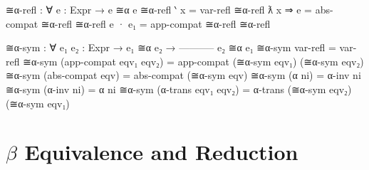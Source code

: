 \documentclass{lecturenotes}
\begin{document}
\begin{itemize}
\begin{code}
≅α-refl : ∀ {e : Expr} → e ≅α e
≅α-refl {‵ x} = var-refl
≅α-refl {ƛ x ⇒ e} = abs-compat ≅α-refl
≅α-refl {e · e₁} = app-compat ≅α-refl ≅α-refl

≅α-sym : ∀ {e₁ e₂ : Expr} →
  e₁ ≅α e₂ →
  -----------
  e₂ ≅α e₁
≅α-sym var-refl = var-refl
≅α-sym (app-compat eqv₁ eqv₂) = app-compat (≅α-sym eqv₁) (≅α-sym eqv₂)
≅α-sym (abs-compat eqv) = abs-compat (≅α-sym eqv)
≅α-sym (α ni) = α-inv ni
≅α-sym (α-inv ni) = α ni
≅α-sym (α-trans eqv₁ eqv₂) = α-trans (≅α-sym eqv₂) (≅α-sym eqv₁)    
\end{code}
\end{itemize}

\section{$\beta$ Equivalence and Reduction}
\label{sec:beta-equivalence}
\end{document}
